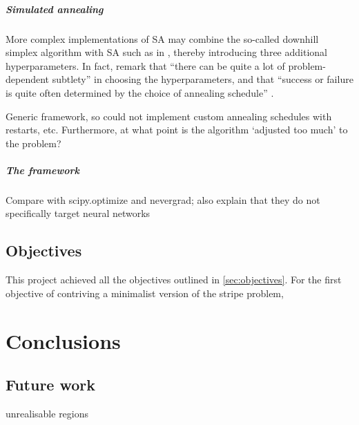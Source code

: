 \paragraph{Simulated annealing}
\label{sec:eval_sim_annealing}
More complex implementations of SA may combine the so-called downhill simplex algorithm \cite{nelder1965} with SA such as in \textcite[p. 444-455]{press1992}, thereby introducing three additional hyperparameters.
In fact, \citeauthor{press1992} remark that ``there can be quite a lot of problem-dependent subtlety'' in choosing the hyperparameters, and that ``success or failure is quite often determined by the choice of annealing schedule'' \cite*[p. 452]{press1992}.

Generic framework, so could not implement custom annealing schedules with restarts, etc.
Furthermore, at what point is the algorithm `adjusted too much' to the problem?

\paragraph{The framework}
Compare with scipy.optimize and nevergrad; also explain that they do not specifically target neural networks

\section{Objectives}
This project achieved all the objectives outlined in \ref{sec:objectives}. 
For the first objective of contriving a minimalist version of the stripe problem, 


\chapter{Conclusions}

\section{Future work}
unrealisable regions


\label{sec:future_work}